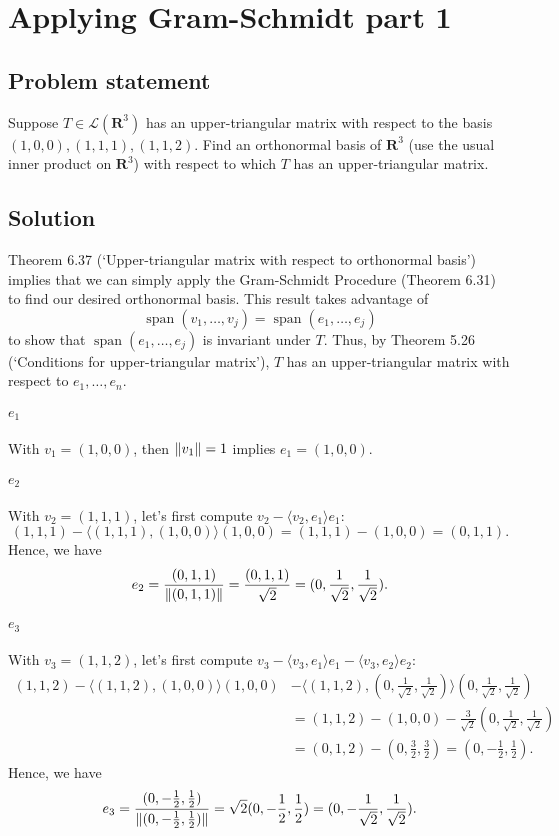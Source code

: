 \documentclass{article}
\begin{document}
\clearpage

\section{Applying Gram-Schmidt part 1}
\subsection*{Problem statement}
Suppose $T\in\mathcal{L}(\mathbf{R}^3)$ has an upper-triangular matrix with respect to the basis $(1,0,0),(1,1,1),(1,1,2)$. 
Find an orthonormal basis of $\mathbf{R}^3$ (use the usual inner product on $\mathbf{R}^3$) with respect to which $T$ has an upper-triangular matrix.

\subsection*{Solution}
Theorem 6.37 (`Upper-triangular matrix with respect to orthonormal basis') implies that we can simply apply the Gram-Schmidt Procedure (Theorem 6.31) to find our desired orthonormal basis. 
This result takes advantage of 
\[\operatorname{span}(v_1,\ldots,v_j)=\operatorname{span}(e_1,\ldots,e_j)\]
to show that $\operatorname{span}(e_1,\ldots,e_j)$ is invariant under $T$. 
Thus, by Theorem 5.26 (`Conditions for upper-triangular matrix'), $T$ has an upper-triangular matrix with respect to $e_1,\ldots,e_n$.

\paragraph{$e_1$}
With $v_1=(1,0,0)$, then $\lVert v_1\rVert=1$ implies $e_1=(1,0,0)$.

\paragraph{$e_2$}
With $v_2=(1,1,1)$, let's first compute $v_2-\langle v_2,e_1\rangle e_1$:
\[(1,1,1)-\langle (1,1,1),(1,0,0)\rangle (1,0,0)=(1,1,1)-(1,0,0)=(0,1,1).\]
Hence, we have
\[e_2=\frac{(0,1,1)}{\lVert(0,1,1)\rVert}=\frac{(0,1,1)}{\sqrt{2}}=(0,\frac{1}{\sqrt{2}},\frac{1}{\sqrt{2}}).\]

\paragraph{$e_3$}
With $v_3=(1,1,2)$, let's first compute $v_3-\langle v_3,e_1\rangle e_1-\langle v_3,e_2\rangle e_2$:
\begin{align*}
    (1,1,2)-\langle (1,1,2),(1,0,0)\rangle (1,0,0)&-\langle (1,1,2),(0,\frac{1}{\sqrt{2}},\frac{1}{\sqrt{2}})\rangle (0,\frac{1}{\sqrt{2}},\frac{1}{\sqrt{2}}) \\
    &=(1,1,2)-(1,0,0)-\frac{3}{\sqrt{2}}(0,\frac{1}{\sqrt{2}},\frac{1}{\sqrt{2}}) \\
    &=(0,1,2)-(0,\frac{3}{2},\frac{3}{2})=(0,-\frac{1}{2},\frac{1}{2}).
\end{align*}
Hence, we have
\[e_3=\frac{(0,-\frac{1}{2},\frac{1}{2})}{\lVert(0,-\frac{1}{2},\frac{1}{2})\rVert}=\sqrt{2}(0,-\frac{1}{2},\frac{1}{2})=(0,-\frac{1}{\sqrt{2}},\frac{1}{\sqrt{2}}).\]
\end{document}
